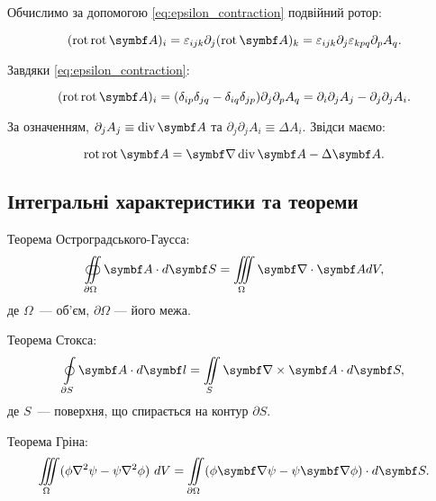 Обчислимо за допомогою \eqref{eq:epsilon_contraction} подвійний ротор:

\begin{equation*}
(\Rot \Rot \vect{A})_i = \varepsilon_{ijk} \partial_j (\Rot \vect{A})_k = \varepsilon_{ijk} \partial_j \varepsilon_{kpq} \partial_p A_q.
\end{equation*}

Завдяки \eqref{eq:epsilon_contraction}:

\begin{equation*}
(\Rot \Rot \vect{A})_i = (\delta_{ip} \delta_{jq} - \delta_{iq} \delta_{jp}) \partial_j \partial_p A_q = \partial_i \partial_j A_j - \partial_j
\partial_j A_i.
\end{equation*}

За означенням, \(\partial_j A_j \equiv \Div \vect{A}\) та \(\partial_j \partial_j A_i \equiv \Delta A_i\). Звідси маємо:

\begin{equation*}
\Rot \Rot \vect{A} = \grad \Div \vect{A} - \Delta \vect{A}.
\end{equation*}

\subsection{Інтегральні характеристики та теореми}

Теорема Ос\-тро\-град\-сько\-го-Гаусса:
\begin{equation}\label{OGTheorem}
	\oiint\limits_{\partial \Omega} \vect{A}\cdot d\vect{S} = \iiint\limits_{\Omega} \divg\vect{A} dV,
\end{equation}
де $\Omega$~--- об'єм, $\partial\Omega$ --- його межа.

Теорема Стокса:
\begin{equation}\label{Stoksheorem}
	\oint\limits_{\partial S} \vect{A}\cdot d\vect{l} = \iint\limits_S \rot\vect{A} \cdot d\vect{S},
\end{equation}
де $S$~--- поверхня, що спирається на контур $\partial S$.

Теорема Гріна:
\begin{equation}\label{Grin}
	\iiint\limits_{\Omega}(\phi \nabla ^{2}\psi -\psi \nabla ^{2}\phi )\ dV=\iint \limits_{\partial \Omega}(\phi \vect{\nabla} \psi -\psi \vect{\nabla}
	\phi )\cdot d\vect{S}.
\end{equation}

